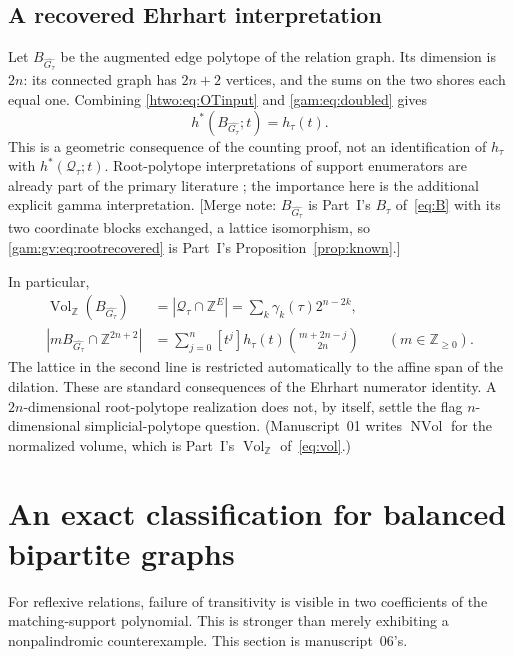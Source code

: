 \documentclass[11pt]{article}
\numberwithin{equation}{section}
\theoremstyle{definition}
\newcommand{\Z}{\mathbb Z}
\newcommand{\N}{\mathbb Z_{\geq0}}
\newcommand{\Qt}{\mathcal Q_\tau}
\newcommand{\Vol}{\operatorname{Vol}_{\Z}}
\begin{document}
\subsection{A recovered Ehrhart interpretation}
Let $B_{\widehat{G_\tau}}$ be the augmented edge polytope of the relation
graph. Its dimension is $2n$: its connected graph has $2n+2$ vertices, and
the sums on the two shores each equal one. Combining
\eqref{htwo:eq:OTinput} and \eqref{gam:eq:doubled} gives
\begin{equation}
 h^*(B_{\widehat{G_\tau}};t)=h_\tau(t).
 \label{gam:gv:eq:rootrecovered}
\end{equation}
This is a geometric consequence of the counting proof, not an identification
of $h_\tau$ with $h^*(\Qt;t)$. Root-polytope interpretations of support
enumerators are already part of the primary literature \cite{DHLTW}; the
importance here is the additional explicit gamma interpretation. [Merge
note: $B_{\widehat{G_\tau}}$ is Part~I's $B_\tau$ of~\eqref{eq:B} with its two
coordinate blocks exchanged, a lattice isomorphism, so
\eqref{gam:gv:eq:rootrecovered} is Part~I's Proposition~\ref{prop:known}.]

In particular,
\begin{align}
 \Vol(B_{\widehat{G_\tau}})
 &=|\Qt\cap\Z^E|
   =\sum_k\gamma_k(\tau)2^{n-2k},\label{gam:gv:eq:volume}\\
 |mB_{\widehat{G_\tau}}\cap\Z^{2n+2}|
 &=\sum_{j=0}^n [t^j]h_\tau(t)
           \binom{m+2n-j}{2n}\qquad(m\in\N).
 \label{gam:gv:eq:ehrhart}
\end{align}
The lattice in the second line is restricted automatically to the affine
span of the dilation. These are standard consequences of the Ehrhart
numerator identity. A $2n$-dimensional root-polytope realization does not,
by itself, settle the flag $n$-dimensional simplicial-polytope question.
(Manuscript~01 writes $\operatorname{NVol}$ for the normalized volume, which
is Part~I's $\Vol$ of~\eqref{eq:vol}.)

\section{An exact classification for balanced bipartite graphs}\label{gam:sec:graph}
For reflexive relations, failure of transitivity is visible in two
coefficients of the matching-support polynomial. This is stronger than
merely exhibiting a nonpalindromic counterexample. This section is
manuscript~06's.
\end{document}

